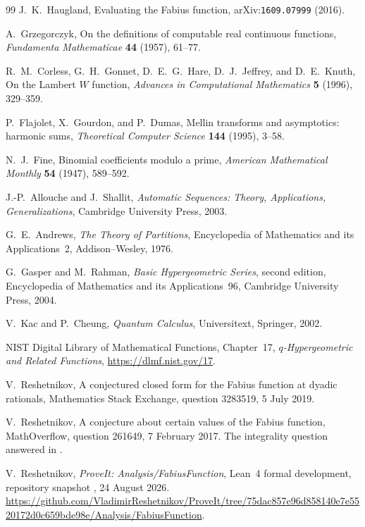 \documentclass[11pt,oneside]{article}
\theoremstyle{definition}
\theoremstyle{remark}
\begin{document}
\begin{thebibliography}{99}
J.~K.~Haugland,
\newblock Evaluating the Fabius function,
\newblock arXiv:\nolinkurl{1609.07999} (2016).

A.~Grzegorczyk,
\newblock On the definitions of computable real continuous functions,
\newblock \emph{Fundamenta Mathematicae} \textbf{44} (1957), 61--77.

R.~M.~Corless, G.~H.~Gonnet, D.~E.~G.~Hare, D.~J.~Jeffrey, and D.~E.~Knuth,
\newblock On the Lambert $W$ function,
\newblock \emph{Advances in Computational Mathematics}
  \textbf{5} (1996), 329--359.

P.~Flajolet, X.~Gourdon, and P.~Dumas,
\newblock Mellin transforms and asymptotics: harmonic sums,
\newblock \emph{Theoretical Computer Science} \textbf{144} (1995), 3--58.

N.~J.~Fine,
\newblock Binomial coefficients modulo a prime,
\newblock \emph{American Mathematical Monthly} \textbf{54} (1947), 589--592.

J.-P.~Allouche and J.~Shallit,
\newblock \emph{Automatic Sequences: Theory, Applications, Generalizations},
\newblock Cambridge University Press, 2003.

G.~E.~Andrews,
\newblock \emph{The Theory of Partitions},
\newblock Encyclopedia of Mathematics and its Applications~2,
  Addison--Wesley, 1976.

G.~Gasper and M.~Rahman,
\newblock \emph{Basic Hypergeometric Series}, second edition,
\newblock Encyclopedia of Mathematics and its Applications~96,
  Cambridge University Press, 2004.

V.~Kac and P.~Cheung,
\newblock \emph{Quantum Calculus},
\newblock Universitext, Springer, 2002.

NIST Digital Library of Mathematical Functions, Chapter~17,
\newblock \emph{$q$-Hypergeometric and Related Functions},
\newblock \url{https://dlmf.nist.gov/17}.

V.~Reshetnikov,
\newblock A conjectured closed form for the Fabius function at dyadic
  rationals,
\newblock Mathematics Stack Exchange, question 3283519, 5 July 2019.

V.~Reshetnikov,
\newblock A conjecture about certain values of the Fabius function,
\newblock MathOverflow, question 261649, 7 February 2017.
\newblock The integrality question answered in \cite{arias2018}.

V.~Reshetnikov,
\newblock \emph{ProveIt: Analysis/FabiusFunction},
\newblock Lean~4 formal development, repository snapshot
  , 24 August 2026.
\newblock \url{https://github.com/VladimirReshetnikov/ProveIt/tree/75dac857e96d858140e7e5520172d0c659bde98e/Analysis/FabiusFunction}.

\end{thebibliography}
\end{document}
